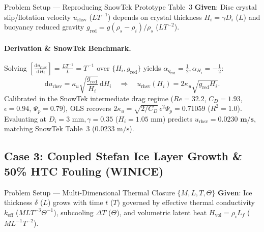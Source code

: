 \documentclass[11pt,a4paper]{article}
\newcommand{\dd}{\mathrm{d}}
\newcommand{\td}[2]{\frac{\dd #1}{\dd #2}}
\newcommand{\dimbr}[1]{\left[#1\right]}
\begin{document}
\begin{setupbox}{Problem Setup — Reproducing SnowTek Prototype Table~3}
\textbf{Given}: Disc crystal slip/flotation velocity $u_{\text{rhsv}}$ ($LT^{-1}$) depends on crystal thickness $H_i = \gamma D_i$ ($L$) and buoyancy reduced gravity $g_{\text{red}} = g(\rho_s - \rho_i)/\rho_s$ ($LT^{-2}$).
\end{setupbox}

\paragraph{Derivation \& SnowTek Benchmark.}
Solving $\dimbr{\td{u_{\text{rhsv}}}{H_i}} = \frac{LT^{-1}}{L} = T^{-1}$ over $\{H_i, g_{\text{red}}\}$ yields $\alpha_{g_{\text{red}}} = \tfrac{1}{2}, \alpha_{H_i} = -\tfrac{1}{2}$:
\begin{equation}
  \dd u_{\text{rhsv}} = \kappa_u \sqrt{\frac{g_{\text{red}}}{H_i}}\,\dd H_i
  \quad\Longrightarrow\quad
  u_{\text{rhsv}}(H_i) = 2\kappa_u \sqrt{g_{\text{red}} H_i}.
\end{equation}
Calibrated in the SnowTek intermediate drag regime ($Re = 32.2$, $C_D = 1.93$, $\epsilon = 0.94$, $\Psi_p = 0.79$), OLS recovers $2\kappa_u = \sqrt{2/C_D}\,\epsilon^2\Psi_p = 0.71059$ ($R^2 = 1.0$). Evaluating at $D_i = 3\text{ mm}, \gamma = 0.35$ ($H_i = 1.05\text{ mm}$) predicts $u_{\text{rhsv}} = \mathbf{0.0230\text{ m/s}}$, matching SnowTek Table~3 ($0.0233\text{ m/s}$).

\subsection{Case 3: Coupled Stefan Ice Layer Growth \& 50\% HTC Fouling (WINICE)}

\begin{setupbox}{Problem Setup — Multi-Dimensional Thermal Closure $\{M, L, T, \Theta\}$}
\textbf{Given}: Ice thickness $\delta$ ($L$) grows with time $t$ ($T$) governed by effective thermal conductivity $k_{\text{eff}}$ ($MLT^{-3}\Theta^{-1}$), subcooling $\Delta T$ ($\Theta$), and volumetric latent heat $H_{\text{vol}} = \rho_i L_f$ ($ML^{-1}T^{-2}$).
\end{setupbox}
\end{document}
